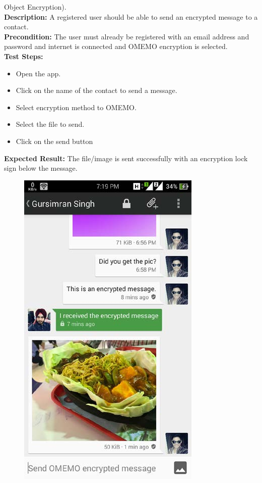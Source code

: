\begin{enumerate}
Object Encryption).\\
\noindent \textbf{Description:}
A registered user should be able to send an encrypted message to a contact.\\
\noindent \textbf{Precondition:}
The user must already be registered with an email address and password and internet is
connected and OMEMO encryption is selected.\\
\noindent \textbf{Test Steps:}
\begin{itemize}
\item Open the app.
\item Click on the name of the contact to send a message.
\item Select encryption method to OMEMO.
\item Select the file to send.
\item Click on the send button
\end{itemize}
\noindent \textbf{Expected Result:}
The file/image is sent successfully with an encryption lock sign below the message.\\
\begin{figure}[ht]
\centering
\includegraphics[scale=0.3]{input/images/s4.png}

\end{figure}
\end{enumerate}
